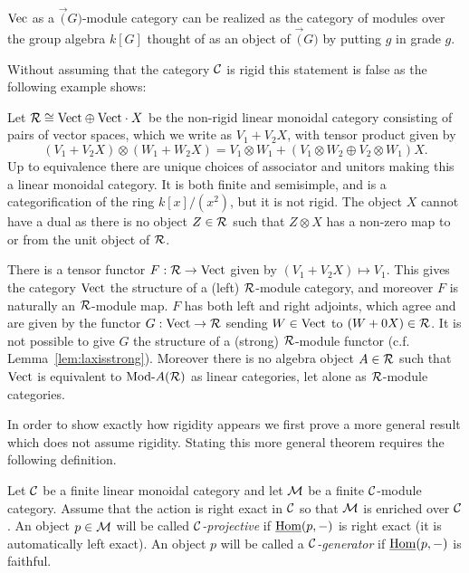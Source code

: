 \documentclass{amsart}
\begin{document}
\begin{example}
$\Vec$ as a $\Vec(G)$-module category can be realized as the category of modules over the group algebra $k[G] $ thought of as an object of $\Vec(G)$ by putting $g$ in grade $g$.  
\end{example}

Without assuming that the category $\cC$ is rigid this statement is false as the following example shows: 

\begin{example} \label{ex:lax-module}
	Let $\cR \cong \Vect \oplus \Vect \cdot X$ be the non-rigid linear monoidal category consisting of pairs of vector spaces, which we write as $V_1 + V_2 X$, with tensor product given by 
	\begin{equation*}
		(V_1 + V_2 X) \otimes (W_1 + W_2 X) = V_1 \otimes W_1  +  (V_1 \otimes W_2 \oplus V_2 \otimes W_1)X.
	\end{equation*} 
	Up to equivalence there are unique choices of associator and unitors making this a linear monoidal category. 
It is both finite and semisimple, and is a categorification of the ring $k[x]/(x^2)$, but it is not rigid. The object $X$ cannot have a dual as there is no object $Z \in \cR$ such that $Z \otimes X$ has a non-zero map to or from the unit object of $\cR$. 
	
	There is a tensor functor $F:\cR \to \Vect$ given by $(V_1 + V_2 X) \mapsto V_1$. This gives the category $\Vect$ the structure of a (left) $\cR$-module category, and moreover $F$ is naturally an $\cR$-module map. $F$ has both left and right adjoints, which agree and are given by the functor $G: \Vect \to \cR$ sending $W \in \Vect$ to $(W + 0 X) \in \cR$. It is not possible to give $G$ the structure of a (strong) $\cR$-module functor (c.f. Lemma~\ref{lem:laxisstrong}). Moreover there is no algebra object $A \in \cR$ such that $\Vect$ is equivalent to $\Mod{}{A}(\cR)$ as linear categories, let alone as $\cR$-module categories. 
\end{example}

In order to show exactly how rigidity appears we first prove a more general result which does not assume rigidity.  Stating this more general theorem requires the following definition.

\begin{definition}
	Let $\cC$ be a finite linear monoidal category and let $\cM$ be a finite $\cC$-module category. Assume that the action is right exact in $\cC$ so that $\cM$ is enriched over $\cC$. 
	An object $p \in \cM$ will be called {\em $\cC$-projective} if $\IHom(p, -)$ is right exact (it is automatically left exact). An object $p$ will be called a {\em $\cC$-generator} if $\IHom(p,-)$ is faithful.
\end{definition}
\end{document}
